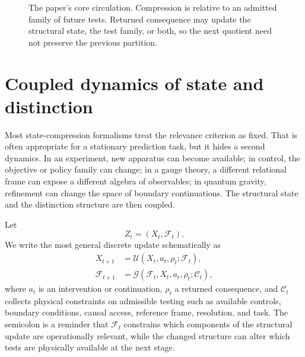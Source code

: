 \documentclass[11pt]{article}
\newcommand{\F}{\mathcal F}
\begin{document}
\begin{figure}[t]
\centering
{}
\caption{The paper's core circulation. Compression is relative to an admitted family of future tests. Returned consequence may update the structural state, the test family, or both, so the next quotient need not preserve the previous partition.}
\label{fig:cycle}
\end{figure}

\section{Coupled dynamics of state and distinction}
\label{sec:dual-dynamics}

Most state-compression formalisms treat the relevance criterion as fixed. That is often appropriate for a stationary prediction task, but it hides a second dynamics. In an experiment, new apparatus can become available; in control, the objective or policy family can change; in a gauge theory, a different relational frame can expose a different algebra of observables; in quantum gravity, refinement can change the space of boundary continuations. The structural state and the distinction structure are then coupled.

Let
\begin{equation}
  Z_t=(X_t,\F_t).
\end{equation}
We write the most general discrete update schematically as
\begin{align}
 X_{t+1}
   &=\mathcal U(X_t,a_t,\rho_t;\F_t),
   \label{eq:structural-update}\\
 \F_{t+1}
   &=\mathcal G(\F_t,X_t,a_t,\rho_t;\mathcal C_t),
   \label{eq:test-update}
\end{align}
where $a_t$ is an intervention or continuation, $\rho_t$ a returned consequence, and $\mathcal C_t$ collects physical constraints on admissible testing such as available controls, boundary conditions, causal access, reference frame, resolution, and task. The semicolon is a reminder that $\F_t$ constrains which components of the structural update are operationally relevant, while the changed structure can alter which tests are physically available at the next stage.
\end{document}
